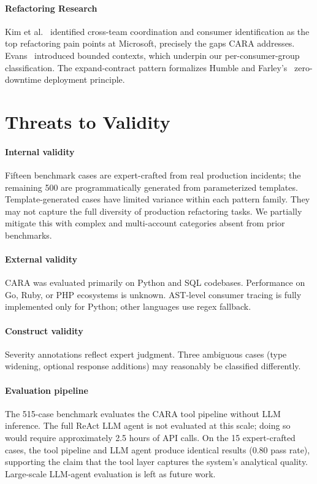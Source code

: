 \documentclass[10pt,twocolumn]{article}
\begin{document}
\paragraph{Refactoring Research} Kim et al.~\cite{kim2012field} identified
cross-team coordination and consumer identification as the top refactoring pain
points at Microsoft, precisely the gaps CARA addresses. Evans~\cite{evans2004ddd}
introduced bounded contexts, which underpin our per-consumer-group classification.
The expand-contract pattern formalizes Humble and Farley's~\cite{humble2010continuous}
zero-downtime deployment principle.

\section{Threats to Validity}

\paragraph{Internal validity} Fifteen benchmark cases are expert-crafted from
real production incidents; the remaining 500 are programmatically generated
from parameterized templates. Template-generated cases have limited variance
within each pattern family. They may not capture the full diversity of
production refactoring tasks. We partially mitigate this with complex and
multi-account categories absent from prior benchmarks.

\paragraph{External validity} CARA was evaluated primarily on Python and SQL
codebases. Performance on Go, Ruby, or PHP ecosystems is unknown. AST-level
consumer tracing is fully implemented only for Python; other languages use
regex fallback.

\paragraph{Construct validity} Severity annotations reflect expert judgment.
Three ambiguous cases (type widening, optional response additions) may
reasonably be classified differently.

\paragraph{Evaluation pipeline} The 515-case benchmark evaluates the CARA
tool pipeline without LLM inference. The full ReAct LLM agent is not
evaluated at this scale; doing so would require approximately 2.5 hours of
API calls. On the 15 expert-crafted cases, the tool pipeline and LLM agent
produce identical results (0.80 pass rate), supporting the claim that the
tool layer captures the system's analytical quality. Large-scale LLM-agent
evaluation is left as future work.
\end{document}
